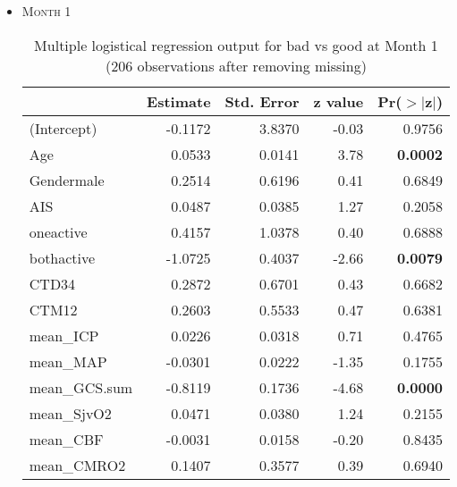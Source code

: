 \documentclass{article}
\begin{document}
\begin{itemize}
\item \textsc{Month 1}
\begin{table}[H]
\centering
\begin{tabular}{lrrrr}
  \hline
 & Estimate & Std. Error & z value & Pr($>$$|$z$|$) \\ 
  \hline
(Intercept) & -0.1172 & 3.8370 & -0.03 & 0.9756 \\ 
  Age & 0.0533 & 0.0141 & 3.78 & {\bf 0.0002} \\ 
  Gendermale & 0.2514 & 0.6196 & 0.41 & 0.6849 \\ 
  AIS & 0.0487 & 0.0385 & 1.27 & 0.2058 \\ 
  oneactive & 0.4157 & 1.0378 & 0.40 & 0.6888 \\ 
  bothactive & -1.0725 & 0.4037 & -2.66 & {\bf 0.0079} \\ 
  CTD34 & 0.2872 & 0.6701 & 0.43 & 0.6682 \\ 
  CTM12 & 0.2603 & 0.5533 & 0.47 & 0.6381 \\ 
  mean\_ICP & 0.0226 & 0.0318 & 0.71 & 0.4765 \\ 
  mean\_MAP & -0.0301 & 0.0222 & -1.35 & 0.1755 \\ 
  mean\_GCS.sum & -0.8119 & 0.1736 & -4.68 & {\bf 0.0000} \\ 
  mean\_SjvO2 & 0.0471 & 0.0380 & 1.24 & 0.2155 \\ 
  mean\_CBF & -0.0031 & 0.0158 & -0.20 & 0.8435 \\ 
  mean\_CMRO2 & 0.1407 & 0.3577 & 0.39 & 0.6940 \\ 
   \hline
\end{tabular}
\caption{Multiple logistical regression output for bad vs good at Month 1 (206 observations after removing missing)}
\end{table}





\end{itemize}
\end{document}

